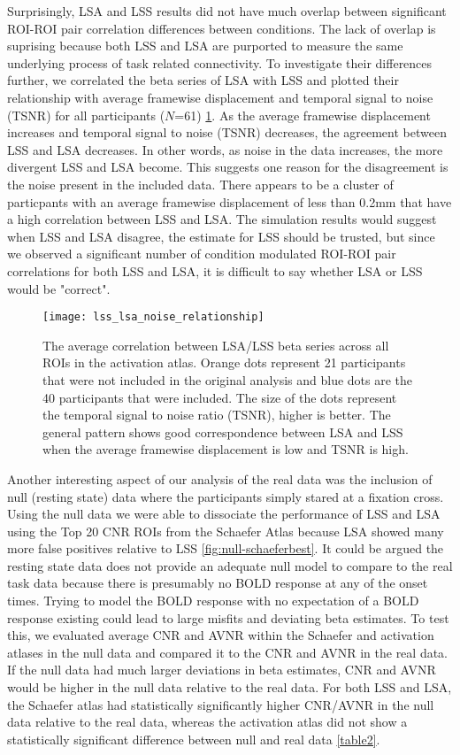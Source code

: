 \documentclass[10pt,letterpaper]{article}
\begin{document}
Surprisingly, LSA and LSS results did not have much overlap between significant
ROI-ROI pair correlation differences between conditions.
The lack of overlap is suprising because both LSS and LSA are purported to
measure the same underlying process of task related connectivity.
To investigate their differences further, we correlated the beta series of LSA with LSS and plotted their relationship with
average framewise displacement and temporal signal to noise (TSNR) for all participants ($N$=61) \ref{fig:lss_lsa_correlation}.
As the average framewise displacement increases and temporal signal to noise (TSNR)
decreases, the agreement between LSS and LSA decreases.
In other words, as noise in the data increases, the more divergent LSS and LSA become.
This suggests one reason for the disagreement is the noise present in the included
data.
There appears to be a cluster of particpants with an average framewise displacement of
less than 0.2mm that have a high correlation between LSS and LSA.
The simulation results would suggest when LSS and LSA disagree, the estimate for LSS should be
trusted, but since we observed a significant number of condition modulated ROI-ROI pair correlations for both
LSS and LSA, it is difficult to say whether LSA or LSS would be "correct".

\begin{figure}[H]
  \centering
  \texttt{[image: lss\_lsa\_noise\_relationship]}
  \caption{
    The average correlation between LSA/LSS beta series across
    all ROIs in the activation atlas.
    Orange dots represent 21 participants that were not included
    in the original analysis and blue dots are the 40
    participants that were included.
    The size of the dots represent the temporal signal to noise
    ratio (TSNR), higher is better.
    The general pattern shows good correspondence between LSA and LSS
    when the average framewise displacement is low and TSNR is high.
  }
  \label{fig:lss_lsa_correlation}
\end{figure}

Another interesting aspect of our analysis of the real data was the inclusion of
null (resting state) data where the participants simply stared at a fixation cross.
Using the null data we were able to dissociate the performance of LSS and LSA using the
Top 20 CNR ROIs from the Schaefer Atlas because LSA showed many more false positives
relative to LSS \ref{fig:null-schaeferbest}.
It could be argued the resting state data does not provide an adequate null model
to compare to the real task data because there is presumably no BOLD response at any
of the onset times.
Trying to model the BOLD response with no expectation of a BOLD response existing could lead
to large misfits and deviating beta estimates.
To test this, we evaluated average CNR and AVNR within the Schaefer and activation atlases in
the null data and compared it to the CNR and AVNR in the real data.
If the null data had much larger deviations in beta estimates, CNR and AVNR would be higher
in the null data relative to the real data.
For both LSS and LSA, the Schaefer atlas had statistically significantly higher
CNR/AVNR in the null data relative to the real data, whereas the activation atlas
did not show a statistically significant difference between null and real data \ref{table2}.
\end{document}
